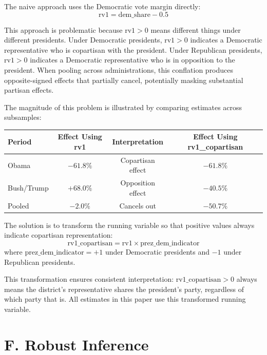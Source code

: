 \documentclass[12pt,letterpaper,oneside]{book}
\begin{document}
The naive approach uses the Democratic vote margin directly:
\begin{equation}
\text{rv1} = \text{dem\_share} - 0.5
\end{equation}

This approach is problematic because $\text{rv1} > 0$ means different things under different presidents. Under Democratic presidents, $\text{rv1} > 0$ indicates a Democratic representative who is copartisan with the president. Under Republican presidents, $\text{rv1} > 0$ indicates a Democratic representative who is in opposition to the president. When pooling across administrations, this conflation produces opposite-signed effects that partially cancel, potentially masking substantial partisan effects.

The magnitude of this problem is illustrated by comparing estimates across subsamples:

\begin{center}
\begin{tabular}{lccc}
\toprule
Period & Effect Using rv1 & Interpretation & Effect Using rv1\_copartisan \\
\midrule
Obama & $-61.8\%$ & Copartisan effect & $-61.8\%$ \\
Bush/Trump & $+68.0\%$ & Opposition effect & $-40.5\%$ \\
Pooled & $-2.0\%$ & Cancels out & $-50.7\%$ \\
\bottomrule
\end{tabular}
\end{center}

The solution is to transform the running variable so that positive values always indicate copartisan representation:
\begin{equation}
\text{rv1\_copartisan} = \text{rv1} \times \text{prez\_dem\_indicator}
\end{equation}
where $\text{prez\_dem\_indicator} = +1$ under Democratic presidents and $-1$ under Republican presidents.

This transformation ensures consistent interpretation: $\text{rv1\_copartisan} > 0$ always means the district's representative shares the president's party, regardless of which party that is. All estimates in this paper use this transformed running variable.

\section*{F. Robust Inference}
\end{document}

